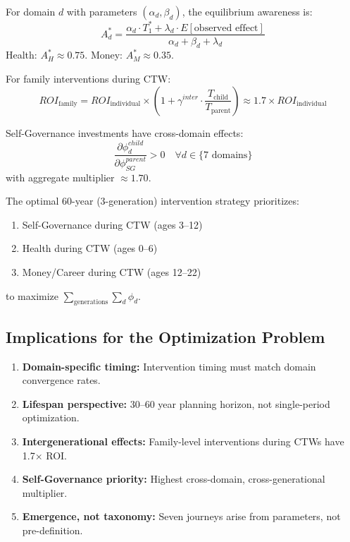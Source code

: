 \begin{theorem}
For domain $d$ with parameters $(\alpha_d, \beta_d)$, the equilibrium awareness is:
\begin{equation}
A^*_d = \frac{\alpha_d \cdot T_1^* + \lambda_d \cdot E[\text{observed effect}]}{\alpha_d + \beta_d + \lambda_d}
\end{equation}
Health: $A^*_H \approx 0.75$. Money: $A^*_M \approx 0.35$.
\end{theorem}

\begin{theorem}
For family interventions during CTW:
\begin{equation}
ROI_{\text{family}} = ROI_{\text{individual}} \times (1 + \gamma^{inter} \cdot \frac{T_{\text{child}}}{T_{\text{parent}}}) \approx 1.7 \times ROI_{\text{individual}}
\end{equation}
\end{theorem}

\begin{theorem}
Self-Governance investments have cross-domain effects:
\begin{equation}
\frac{\partial \phi^{child}_d}{\partial \phi^{parent}_{SG}} > 0 \quad \forall d \in \{\text{7 domains}\}
\end{equation}
with aggregate multiplier $\approx 1.70$.
\end{theorem}

\begin{theorem}
The optimal 60-year (3-generation) intervention strategy prioritizes:
\begin{enumerate}[nosep]
\item Self-Governance during CTW (ages 3--12)
\item Health during CTW (ages 0--6)
\item Money/Career during CTW (ages 12--22)
\end{enumerate}
to maximize $\sum_{\text{generations}} \sum_d \phi_d$.
\end{theorem}

\subsection{Implications for the Optimization Problem}

\begin{enumerate}[nosep]
\item \textbf{Domain-specific timing:} Intervention timing must match domain convergence rates.
\item \textbf{Lifespan perspective:} 30--60 year planning horizon, not single-period optimization.
\item \textbf{Intergenerational effects:} Family-level interventions during CTWs have 1.7× ROI.
\item \textbf{Self-Governance priority:} Highest cross-domain, cross-generational multiplier.
\item \textbf{Emergence, not taxonomy:} Seven journeys arise from parameters, not pre-definition.
\end{enumerate}

